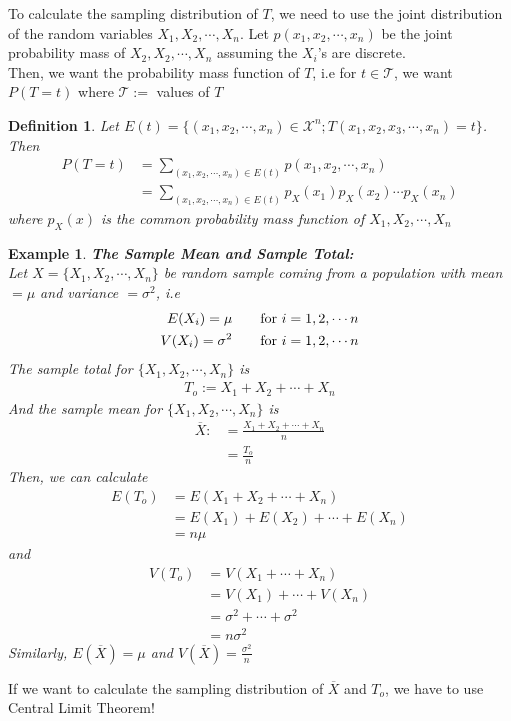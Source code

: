 \documentclass[11pt,oneside]{book}
\theoremstyle{newStyle}
\newtheorem{defn}[thm]{Definition}
\newtheorem{ex}{Example}[section]
\newcommand{\X}{\mathcal{X}}
\begin{document}
To calculate the sampling distribution of $T$, we need to use the joint distribution of the random variables $X_1,X_2,\cdots,X_n$. Let $p(x_1,x_2,\cdots,x_n)$ be the joint probability mass of $X_2,X_2,\cdots,X_n$ assuming the $X_i$'s are discrete.\\
Then, we want the probability mass function of $T$, i.e for $t\in \mathcal{T}$, we want $P(T=t)$ where $\mathcal{T}:=$ values of $T$\begin{defn}
Let $E(t)=\{(x_1,x_2,\cdots,x_n)\in \X^n;T(x_1,x_2,x_3,\cdots,x_n)=t\}$. Then \begin{align*}
P(T=t)&=\sum_{(x_1,x_2,\cdots,x_n)\in E(t)}p(x_1,x_2,\cdots,x_n)\\
&=\sum_{(x_1,x_2,\cdots,x_n)\in E(t)}p_X(x_1)p_X(x_2)\cdots p_X(x_n)
\end{align*}
where $p_X(x)$ is the common probability mass function of $X_1,X_2,\cdots,X_n$
\end{defn}
\begin{ex}
\textbf{The Sample Mean and Sample Total:}\\
 Let $X=\{X_1,X_2,\cdots,X_n\}$ be random sample coming from a population with mean $=\mu$ and variance $=\sigma^2$, i.e \begin{align*}
 E(X_i)=\mu &\text{\qquad for }i=1,2,\cdots n\\
  V(X_i)=\sigma^2 &\text{\qquad for }i=1,2,\cdots n
 \end{align*}
 The sample total for $\{X_1,X_2,\cdots,X_n\}$ is \begin{align*}
T_o:=X_1+X_2+\cdots+X_n
 \end{align*}
 And the sample mean for $\{X_1,X_2,\cdots,X_n\}$ is \begin{align*}
 \overline{X}:&=\frac{X_1+X_2+\cdots+X_n}{n}\\
&=\frac{T_o}{n} 
 \end{align*}
 Then, we can calculate \begin{align*}
 E(T_o)&=E(X_1+X_2+\cdots+X_n)\\
 &=E(X_1)+E(X_2)+\cdots +E(X_n)\\
 &=n\mu
 \end{align*}
 and \begin{align*}
 V(T_o)&=V(X_1+\cdots+X_n)\\
 &=V(X_1)+\cdots+V(X_n)\\
 &=\sigma^2+\cdots+\sigma^2\\
 &=n\sigma^2
 \end{align*}
 Similarly, $E(\overline{X})=\mu$ and $V(\overline{X})=\frac{\sigma^2}{n}$
 \end{ex}
 If we want to calculate the sampling distribution of $\overline{X}$ and $T_o$, we have to use Central Limit Theorem!\\
\end{document}
